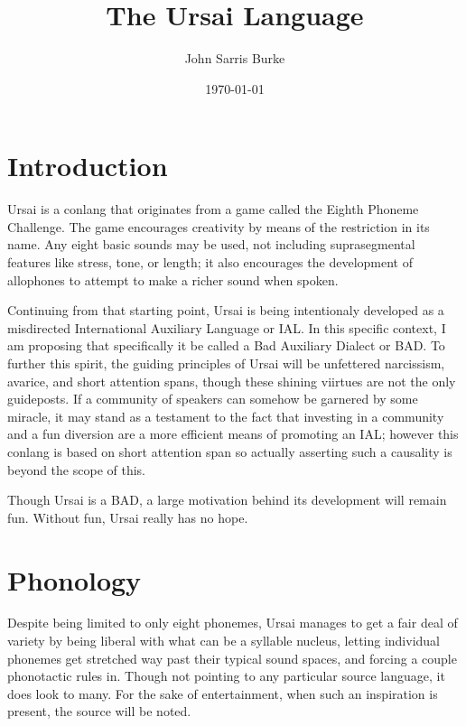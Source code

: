 \documentclass[11pt,letterpaper]{article}
\title{The Ursai Language}
\date{\today}
\author{John Sarris Burke}
\begin{document}
\maketitle
\tableofcontents

\pagebreak

\section{Introduction}
  Ursai is a conlang that originates from a game called the Eighth Phoneme Challenge. The game encourages creativity by means of the restriction in its name. Any eight basic sounds may be used, not including suprasegmental features like stress, tone, or length; it also encourages the development of allophones to attempt to make a richer sound when spoken.
  \par
  Continuing from that starting point, Ursai is being intentionaly developed as a misdirected International Auxiliary Language or IAL. In this specific context, I am proposing that specifically it be called a Bad Auxiliary Dialect or BAD. To further this spirit, the guiding principles of Ursai will be unfettered narcissism, avarice, and short attention spans, though these shining viirtues are not the only guideposts. If a community of speakers can somehow be garnered by some miracle, it may stand as a testament to the fact that investing in a community and a fun diversion are a more efficient means of promoting an IAL; however this conlang is based on short attention span so actually asserting such a causality is beyond the scope of this.
  \par
  Though Ursai is a BAD, a large motivation behind its development will remain fun. Without fun, Ursai really has no hope.

\pagebreak
\section{Phonology}
	Despite being limited to only eight phonemes, Ursai manages to get a fair deal of variety by being liberal with what can be a syllable nucleus, letting individual phonemes get stretched way past their typical sound spaces, and forcing a couple phonotactic rules in.  Though not pointing to any particular source language, it does look to many.  For the sake of entertainment, when such an inspiration is present, the source will be noted.
\end{document}

